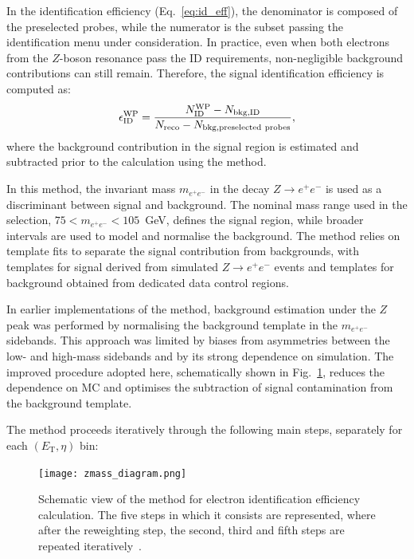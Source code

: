 In the identification efficiency (Eq.~\ref{eq:id_eff}), the denominator is composed of the preselected probes, while the numerator is the subset passing the identification menu under consideration. In practice, even when both electrons from the $Z$-boson resonance pass the ID requirements, non-negligible background contributions can still remain. Therefore, the signal identification efficiency is computed as:
\begin{equation}
  \small 
  \epsilon^{\text{WP}}_{\mathrm{ID}} = \frac{N^{\mathrm{WP}}_{\mathrm{ID}} - N_{\mathrm{bkg,ID}}}{N_{\mathrm{reco}} - N_{\mathrm{bkg,preselected\ probes}}},
\label{eq:id_eff}  
\end{equation}
where the background contribution in the signal region is estimated and subtracted prior to the calculation using the \zmass method.

In this method, the invariant mass $m_{e^+e^-}$ in the decay $Z\rightarrow e^+e^-$ is used as a discriminant between signal and background. The nominal mass range used in the selection, $75 < m_{e^+e^-} < 105$~GeV, defines the signal region, while broader intervals are used to model and normalise the background. The method relies on template fits to separate the signal contribution from backgrounds, with templates for signal derived from simulated $Z\rightarrow e^+e^-$ events and templates for background obtained from dedicated data control regions.

In earlier implementations of the \zmass method, background estimation under the $Z$ peak was performed by normalising the background template in the $m_{e^+e^-}$ sidebands. This approach was limited by biases from asymmetries between the low- and high-mass sidebands and by its strong dependence on simulation. The improved procedure adopted here, schematically shown in Fig.~\ref{fig:zmass_algo}, reduces the dependence on MC and optimises the subtraction of signal contamination from the background template.

The method proceeds iteratively through the following main steps, separately for each $(E_{\mathrm{T}},\eta)$ bin:

\begin{figure}[htbp]
  \centering
  \texttt{[image: zmass\_diagram.png]}
  \caption{Schematic view of the \zmass method for electron identification efficiency calculation. The five steps in which it consists are represented, where after the reweighting step, the second, third and fifth steps are repeated iteratively~\cite{elias_thesis}.}
  \label{fig:zmass_algo}
\end{figure}

